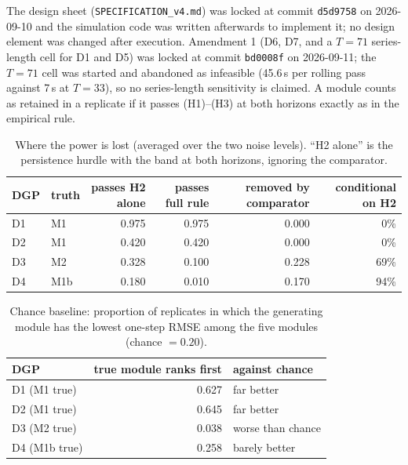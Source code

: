 The design sheet (\texttt{SPECIFICATION\_v4.md}) was locked at commit \texttt{d5d9758} on 2026-09-10 and the simulation code was written afterwards to implement it; no design element was changed after execution. Amendment 1 (D6, D7, and a $T=71$ series-length cell for D1 and D5) was locked at commit \texttt{bd0008f} on 2026-09-11; the $T=71$ cell was started and abandoned as infeasible (45.6\,s per rolling pass against 7\,s at $T=33$), so no series-length sensitivity is claimed. A module counts as retained in a replicate if it passes (H1)--(H3) at both horizons exactly as in the empirical rule.

\begin{table}[!htb]
\centering\small
\caption{Where the power is lost (averaged over the two noise levels). ``H2 alone'' is the persistence hurdle with the band at both horizons, ignoring the comparator.}
\label{tab:si_power}
\begin{tabular}{@{}llrrrr@{}}
\toprule
DGP & truth & passes H2 alone & passes full rule & removed by comparator & conditional on H2 \\
\midrule
D1 & M1 & 0.975 & 0.975 & 0.000 & 0\% \\
D2 & M1 & 0.420 & 0.420 & 0.000 & 0\% \\
D3 & M2 & 0.328 & 0.100 & 0.228 & 69\% \\
D4 & M1b & 0.180 & 0.010 & 0.170 & 94\% \\
\bottomrule
\end{tabular}
\end{table}

\begin{table}[!htb]
\centering\small
\caption{Chance baseline: proportion of replicates in which the generating module has the lowest one-step RMSE among the five modules (chance $=0.20$).}
\label{tab:si_chance}
\begin{tabular}{@{}lrl@{}}
\toprule
DGP & true module ranks first & against chance \\
\midrule
D1 (M1 true) & 0.627 & far better \\
D2 (M1 true) & 0.645 & far better \\
D3 (M2 true) & 0.038 & worse than chance \\
D4 (M1b true) & 0.258 & barely better \\
\bottomrule
\end{tabular}
\end{table}

